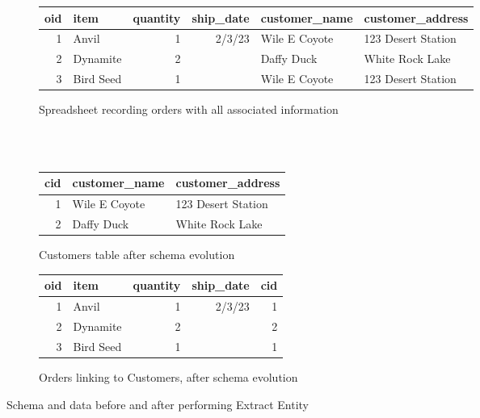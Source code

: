 \documentclass[english,submission]{programming}
\begin{document}
\begin{figure}
\begin{adjustwidth}{-2em}{-3em}
\begin{subfigure}[b]{35em}\vspace{0pt}
  \sffamily
  \small
  \begin{tabular}{ |r|l|r|r|l|l|}
     \hline
     oid & item & quantity & ship\_date & customer\_name & customer\_address \\
     \hline \hline
     1 & Anvil & 1 & 2/3/23 & Wile E Coyote & 123 Desert Station \\
     \hline
     2 & Dynamite & 2 & & Daffy Duck & White Rock Lake \\
     \hline
     3 & Bird Seed & 1 & & Wile E Coyote & 123 Desert Station \\
     \hline
  \end{tabular}
  \caption{Spreadsheet recording orders with all associated information}
  \label{fig:db-orders}
\end{subfigure}
\hfill
\\[-0.5em]~\\
\begin{subfigure}[b]{20em}\vspace{0pt}
  \sffamily
  \small
  \begin{tabular}{ |r|l|l|}
    \hline
    cid & customer\_name & customer\_address \\
    \hline \hline
    1 & Wile E Coyote & 123 Desert Station \\
    \hline
    2 & Daffy Duck & White Rock Lake \\
    \hline
  \end{tabular}
  \caption{Customers table after schema evolution}
  \label{fig:db-customers}
\end{subfigure}
\hfill
\begin{subfigure}[b]{20em}\vspace{0pt}
  \sffamily
  \small
  \begin{tabular}{ |r|l|r|r|r|}
     \hline
     oid & item & quantity & ship\_date & cid \\
     \hline \hline
     1 & Anvil & 1 & 2/3/23 & 1 \\
     \hline
     2 & Dynamite & 2 & & 2  \\
     \hline
     3 & Bird Seed & 1 & & 1 \\
     \hline
    \end{tabular}
  \caption{Orders linking to Customers, after schema evolution}
 \label{fig:db-orders-link}
\end{subfigure}
\end{adjustwidth}
\vspace{0.25em}
\caption{Schema and data before and after performing Extract Entity}
\label{fig:db}
\end{figure}
\end{document}
